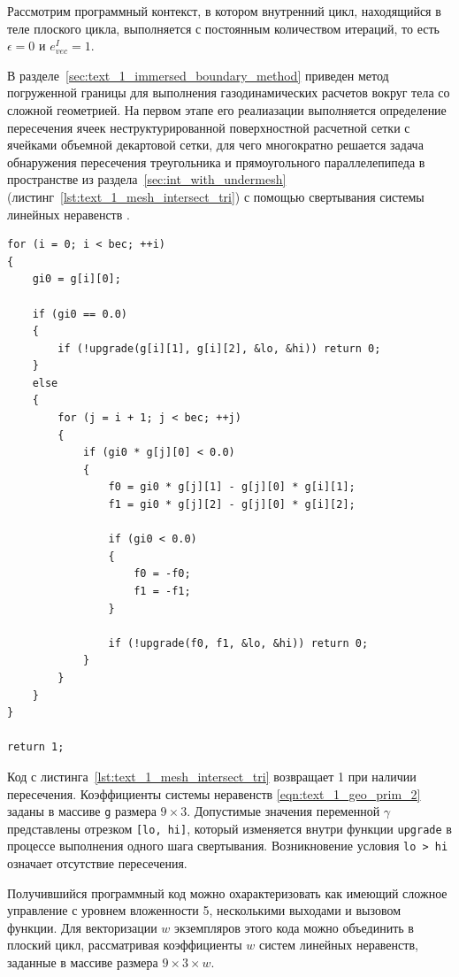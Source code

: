 Рассмотрим программный контекст, в котором внутренний цикл, находящийся в теле плоского цикла, выполняется с постоянным количеством итераций, то есть $\epsilon = 0$ и $e_{vec}^I = 1$.

В разделе~\ref{sec:text_1_immersed_boundary_method} приведен метод погруженной границы для выполнения газодинамических расчетов вокруг тела со сложной геометрией.
На первом этапе его реалиазации выполняется определение пересечения ячеек неструктурированной поверхностной расчетной сетки с ячейками объемной декартовой сетки, для чего многократно решается задача обнаружения пересечения треугольника и прямоугольного параллелепипеда в пространстве из раздела~\ref{sec:int_with_undermesh} (листинг~\ref{lst:text_1_mesh_intersect_tri}) с помощью свертывания системы линейных неравенств \cite{Chernikov1963}.

\begin{singlespace}
\begin{lstlisting}[caption={Определение пересечения треугольника и прямоугольного параллелепипеда с помощью свертывания системы линейных неравенств.},label={lst:text_1_mesh_intersect_tri}]
for (i = 0; i < bec; ++i)
{
    gi0 = g[i][0];

    if (gi0 == 0.0)
    {
        if (!upgrade(g[i][1], g[i][2], &lo, &hi)) return 0;
    }
    else
    {
        for (j = i + 1; j < bec; ++j)
        {
            if (gi0 * g[j][0] < 0.0)
            {
                f0 = gi0 * g[j][1] - g[j][0] * g[i][1];
                f1 = gi0 * g[j][2] - g[j][0] * g[i][2];

                if (gi0 < 0.0)
                {
                    f0 = -f0;
                    f1 = -f1;
                }

                if (!upgrade(f0, f1, &lo, &hi)) return 0;
            }
        }
    }
}

return 1;
\end{lstlisting}
\end{singlespace}

Код с листинга~\ref{lst:text_1_mesh_intersect_tri} возвращает 1 при наличии пересечения.
Коэффициенты системы неравенств \eqref{eqn:text_1_geo_prim_2} заданы в массиве \texttt{g} размера $9 \times 3$.
Допустимые значения переменной $\gamma$ представлены отрезком \texttt{[lo, hi]}, который изменяется внутри функции \texttt{upgrade} в процессе выполнения одного шага свертывания.
Возникновение условия \texttt{lo > hi} означает отсутствие пересечения.

Получившийся программный код можно охарактеризовать как имеющий сложное управление с уровнем вложенности 5, несколькими выходами и вызовом функции.
Для векторизации $w$ экземпляров этого кода можно объединить в плоский цикл, рассматривая коэффициенты $w$ систем линейных неравенств, заданные в массиве размера $9 \times 3 \times w$.

